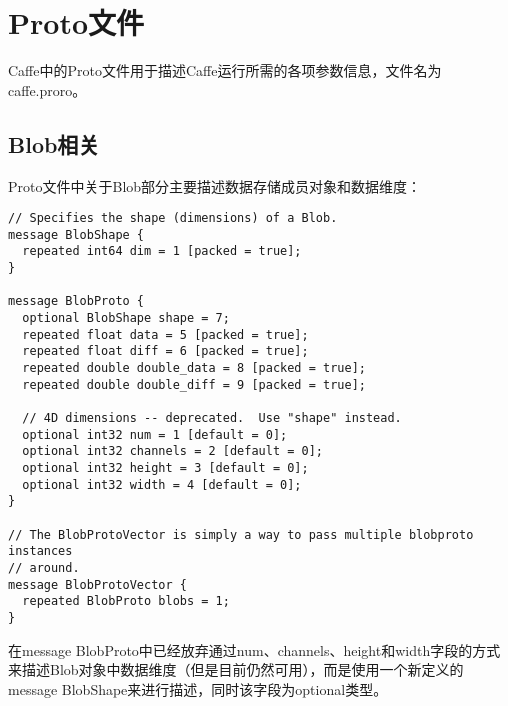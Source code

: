 \chapter{Proto文件}
Caffe中的Proto文件用于描述Caffe运行所需的各项参数信息，文件名为caffe.proro。
\section{Blob相关}\label{proto/file/blob}
Proto文件中关于Blob部分主要描述数据存储成员对象和数据维度：
\begin{verbatim}
// Specifies the shape (dimensions) of a Blob.
message BlobShape {
  repeated int64 dim = 1 [packed = true];
}

message BlobProto {
  optional BlobShape shape = 7;
  repeated float data = 5 [packed = true];
  repeated float diff = 6 [packed = true];
  repeated double double_data = 8 [packed = true];
  repeated double double_diff = 9 [packed = true];

  // 4D dimensions -- deprecated.  Use "shape" instead.
  optional int32 num = 1 [default = 0];
  optional int32 channels = 2 [default = 0];
  optional int32 height = 3 [default = 0];
  optional int32 width = 4 [default = 0];
}

// The BlobProtoVector is simply a way to pass multiple blobproto instances
// around.
message BlobProtoVector {
  repeated BlobProto blobs = 1;
}
\end{verbatim}
在message BlobProto中已经放弃通过num、channels、height和width字段的方式来描述Blob对象中数据维度（但是目前仍然可用），而是使用一个新定义的message BlobShape来进行描述，同时该字段为optional类型。
